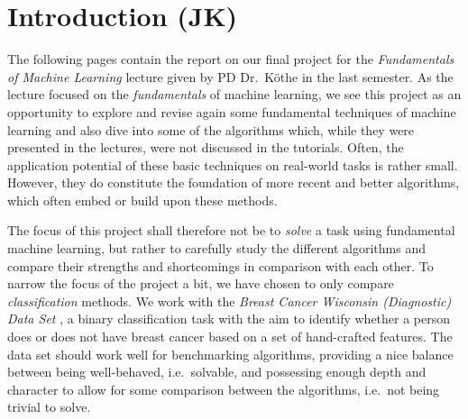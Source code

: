 \documentclass[12pt, a4paper]{scrartcl}
\begin{document}
\tableofcontents
\pagebreak







\section{Introduction (JK)}
The following pages contain the report on our final project for the \emph{Fundamentals of Machine Learning} lecture given by PD Dr.\ Köthe in the last semester. As the lecture focused on the \emph{fundamentals} of machine learning, we see this project as an opportunity to explore and revise again some fundamental techniques of machine learning and also dive into some of the algorithms which, while they were presented in the lectures, were not discussed in the tutorials.  Often, the application potential of these basic techniques on real-world tasks is rather small. However, they do constitute the foundation of more recent and better algorithms, which often embed or build upon these methods. 

The focus of this project shall therefore not be to \emph{solve} a task using fundamental machine learning, but rather to carefully study the different algorithms and compare their strengths and shortcomings in comparison with each other. To narrow the focus of the project a bit, we have chosen to only compare \emph{classification} methods.
We work with the \emph{Breast Cancer Wisconsin (Diagnostic) Data Set} \cite{street1993nuclear}, a binary classification task with the aim to identify whether a person does or does not have breast cancer based on a set of hand-crafted features. The data set should work well for benchmarking algorithms, providing a nice balance between being well-behaved, i.e.\ solvable, and possessing enough depth and character to allow for some comparison between the algorithms, i.e.\  not being trivial to solve.
\end{document}
